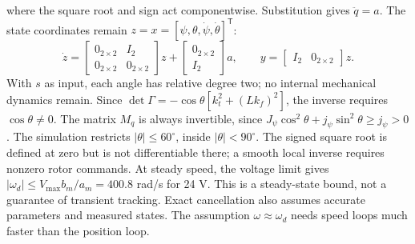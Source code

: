where the square root and sign act componentwise. Substitution gives $\ddot q=a$. The state coordinates remain $z=x=[\psi,\theta,\dot\psi,\dot\theta]^\mathsf{T}$:
\begin{equation}
\dot z=\begin{bmatrix}0_{2\times2}&I_2\\0_{2\times2}&0_{2\times2}\end{bmatrix}z
+\begin{bmatrix}0_{2\times2}\\I_2\end{bmatrix}a,\qquad
y=\begin{bmatrix}I_2&0_{2\times2}\end{bmatrix}z.
\end{equation}
With $s$ as input, each angle has relative degree two; no internal mechanical dynamics remain. Since $\det\Gamma=-\cos\theta[k_t^2+(Lk_f)^2]$, the inverse requires $\cos\theta\ne0$. The matrix $M_q$ is always invertible, since $J_\psi\cos^2\theta+j_\psi\sin^2\theta\ge j_\psi>0$. The simulation restricts $|\theta|\le60^\circ$, inside $|\theta|<90^\circ$. The signed square root is defined at zero but is not differentiable there; a smooth local inverse requires nonzero rotor commands. At steady speed, the voltage limit gives $|\omega_d|\le V_{\max}b_m/a_m=400.8$ rad/s for 24 V. This is a steady-state bound, not a guarantee of transient tracking. Exact cancellation also assumes accurate parameters and measured states. The assumption $\omega\approx\omega_d$ needs speed loops much faster than the position loop.

